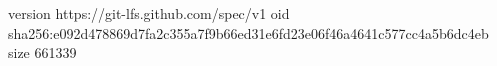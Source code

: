 version https://git-lfs.github.com/spec/v1
oid sha256:e092d478869d7fa2c355a7f9b66ed31e6fd23e06f46a4641c577cc4a5b6dc4eb
size 661339
